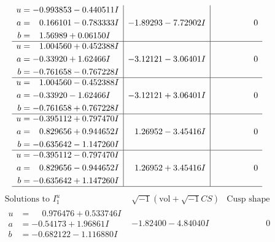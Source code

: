 \documentclass[1p]{elsarticle_modified}
\theoremstyle{definition}
\newcommand{\I}{\sqrt{-1}}
\begin{document}
$$\begin{array}{c|c|c}
\begin{aligned}
u &= -0.993853 - 0.440511 I \\
a &= \phantom{-}0.166101 - 0.783333 I \\
b &= \phantom{-}1.56989 + 0.06150 I\end{aligned}
 & -1.89293 - 7.72902 I & \phantom{-0.000000 } 0 \\ \hline\begin{aligned}
u &= \phantom{-}1.004560 + 0.452388 I \\
a &= -0.33920 + 1.62466 I \\
b &= -0.761658 - 0.767228 I\end{aligned}
 & -3.12121 - 3.06401 I & \phantom{-0.000000 } 0 \\ \hline\begin{aligned}
u &= \phantom{-}1.004560 - 0.452388 I \\
a &= -0.33920 - 1.62466 I \\
b &= -0.761658 + 0.767228 I\end{aligned}
 & -3.12121 + 3.06401 I & \phantom{-0.000000 } 0 \\ \hline\begin{aligned}
u &= -0.395112 + 0.797470 I \\
a &= \phantom{-}0.829656 + 0.944652 I \\
b &= -0.635642 - 1.147260 I\end{aligned}
 & \phantom{-}1.26952 - 3.45416 I & \phantom{-0.000000 } 0 \\ \hline\begin{aligned}
u &= -0.395112 - 0.797470 I \\
a &= \phantom{-}0.829656 - 0.944652 I \\
b &= -0.635642 + 1.147260 I\end{aligned}
 & \phantom{-}1.26952 + 3.45416 I & \phantom{-0.000000 } 0\\
 \hline 
 \end{array}$$\newpage$$\begin{array}{c|c|c}  
\text{Solutions to }I^u_{1}& \I (\text{vol} + \sqrt{-1}CS) & \text{Cusp shape}\\
 \hline 
\begin{aligned}
u &= \phantom{-}0.976476 + 0.533746 I \\
a &= -0.54173 + 1.96861 I \\
b &= -0.682122 - 1.116880 I\end{aligned}
 & -1.82400 - 4.84040 I & \phantom{-0.000000 } 0 \\ \hline\begin{aligned}

\end{aligned}
\end{array}$$
\end{document}
